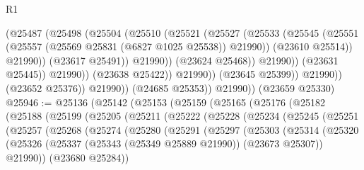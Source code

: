 \begin{lexlean}{R1}
\begin{coremodule}
                                    (@25487
                                      (@25498
                                        (@25504
                                          (@25510
                                            (@25521
                                              (@25527
                                                (@25533
                                                  (@25545
                                                    (@25551
                                                      (@25557
                                                        (@25569 @25831 (@6827 @1025 @25538))
                                                        @21990))
                                                    (@23610 @25514))
                                                  @21990))
                                              (@23617 @25491))
                                            @21990))
                                        (@23624 @25468))
                                      @21990))
                                  (@23631 @25445))
                                @21990))
                            (@23638 @25422))
                          @21990))
                      (@23645 @25399))
                    @21990))
                (@23652 @25376))
              @21990))
          (@24685 @25353))
        @21990))
    (@23659 @25330)
@25946 := @25136
    (@25142
      (@25153
        (@25159
          (@25165
            (@25176
              (@25182
                (@25188
                  (@25199
                    (@25205
                      (@25211
                        (@25222
                          (@25228
                            (@25234
                              (@25245
                                (@25251
                                  (@25257
                                    (@25268
                                      (@25274
                                        (@25280
                                          (@25291
                                            (@25297
                                              (@25303
                                                (@25314
                                                  (@25320
                                                    (@25326
                                                      (@25337
                                                        (@25343 (@25349 @25889 @21990))
                                                        (@23673 @25307))
                                                      @21990))
                                                  (@23680 @25284))

\end{coremodule}
\end{lexlean}
